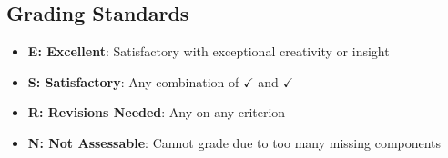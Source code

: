 \documentclass[12pt]{article}
\begin{document}
\subsection*{Grading Standards}

\begin{itemize}
\item \textbf{E: Excellent}: Satisfactory with exceptional creativity or insight
\item \textbf{S: Satisfactory}: Any combination of $\checkmark$ and $\checkmark\!-$ 
\item \textbf{R: Revisions Needed}: Any  on any criterion
\item \textbf{N: Not Assessable}: Cannot grade due to too many missing components
\end{itemize}
\end{document}
